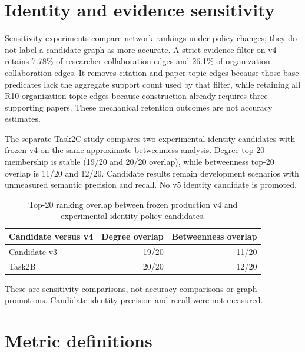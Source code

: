 \section{Identity and evidence sensitivity}

Sensitivity experiments compare network rankings under policy changes; they do
not label a candidate graph as more accurate. A strict evidence filter on v4
retains 7.78\% of researcher collaboration edges and 26.1\% of organization
collaboration edges. It removes citation and paper-topic edges because those
base predicates lack the aggregate support count used by that filter, while
retaining all R10 organization-topic edges because construction already requires
three supporting papers. These mechanical retention outcomes are not accuracy
estimates.

The separate Task2C study compares two experimental identity candidates with
frozen v4 on the same approximate-betweenness analysis. Degree top-20 membership
is stable (19/20 and 20/20 overlap), while betweenness top-20 overlap is 11/20
and 12/20. Candidate results remain development scenarios with unmeasured
semantic precision and recall. No v5 identity candidate is promoted.

\begin{table}[!htbp]
  \centering
  \caption[Identity-policy ranking sensitivity]{Top-20 ranking overlap between frozen production v4 and experimental
  identity-policy candidates.}
  \label{tab:identity-sensitivity}
  \begin{tabular}{lrr}
    \toprule
    \textbf{Candidate versus v4} & \textbf{Degree overlap} & \textbf{Betweenness overlap}\\
    \midrule
    Candidate-v3 & 19/20 & 11/20\\
    Task2B & 20/20 & 12/20\\
    \bottomrule
  \end{tabular}
  \begin{minipage}{0.82\textwidth}
    \vspace{0.35em}\footnotesize These are sensitivity comparisons, not accuracy comparisons or graph promotions. Candidate identity precision and recall were not measured.
  \end{minipage}
\end{table}
\FloatBarrier

\section{Metric definitions}

